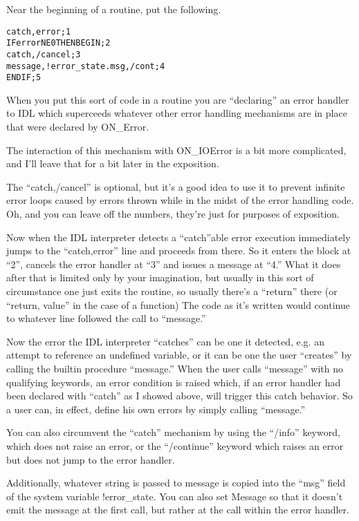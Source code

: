 \begin{itemize}
  Near the beginning of a routine, put the following.


\begin{alltt}
catch, error                      ; 1
IF error NE 0 THEN BEGIN          ; 2
  catch,/cancel                   ; 3
  message,!error_state.msg,/cont  ; 4
ENDIF                             ; 5
\end{alltt}

 When you put this sort of code in a routine you are ``declaring'' an
 error handler to IDL which superceeds whatever other error handling
 mechanisms are in place that were declared by ON\_Error. 

 The interaction of this mechanism with ON\_IOError is a bit more
 complicated, and I'll leave that for a bit later in the exposition.

 The ``catch,/cancel'' is optional, but it's a good idea to use it to
 prevent infinite error loops caused by errors thrown while in the
 midst of the error handling code. Oh, and you can leave off the
 numbers, they're just for purposes of exposition.

  Now when the IDL interpreter detects a ``catch''able error execution
 immediately jumps to the ``catch,error'' line and proceeds from
 there. So it enters the block at ``2'', cancels the error handler at
 ``3'' and issues a message at ``4.'' What it does after that is
 limited only by your imagination, but usually in this sort of
 circumstance one just exits the routine, so usually there's a
 ``return'' there (or ``return, value'' in the case of a function) The
 code as it's written would continue to whatever line followed the
 call to ``message.''

  Now the error the IDL interpreter ``catches'' can be one it detected,
 e.g. an attempt to  reference an undefined variable, or it can be one the
 user ``creates'' by calling the builtin procedure ``message.'' When
 the user calls ``message'' with no qualifying keywords, an error
 condition is raised which, if an error handler had been declared with
 ``catch'' as I showed above, will trigger this catch behavior. So a
 user can, in effect, define his own errors by simply calling
 ``message.''

  You can also circumvent the ``catch'' mechanism by using the
 ``/info'' keyword, which does not raise an error, or the
 ``/continue'' keyword which raises an error but does not jump to the
 error handler.

  Additionally, whatever string is passed to message is copied into the
 ``msg'' field of the system variable !error\_state.  You can also set
 Message so that it doesn't emit the message at the first call, but
 rather at the call within the error handler.


\end{itemize}
